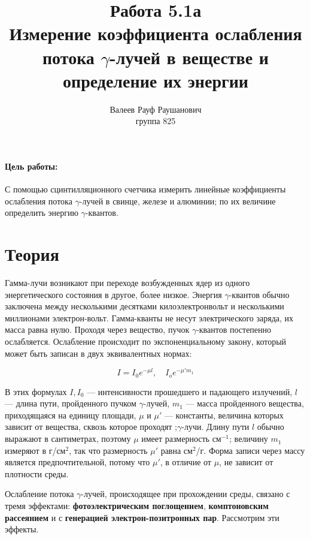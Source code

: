 \documentclass[a4paper, 12pt]{article}%
\author{Валеев Рауф Раушанович \\
группа 825}
\title{\textbf{Работа 5.1а\\
Измерение коэффициента ослабления потока $\gamma$-лучей в веществе и определение их энергии}}
\begin{document}
\maketitle
\newpage
\paragraph*{Цель работы:} С помощью сцинтилляционного счетчика измерить линейные коэффициенты ослабления потока $ \gamma $-лучей в свинце, железе и алюминии; по их величине определить энергию $ \gamma $-квантов.
\section*{Теория}
	Гамма-лучи возникают при переходе возбужденных ядер из одного энергетического состояния в другое, более низкое. Энергия $ \gamma $-квантов обычно заключена между несколькими десятками килоэлектронвольт и несколькими миллионами электрон-вольт. Гамма-кванты не несут электрического заряда, их масса равна нулю. Проходя через вещество, пучок $ \gamma $-квантов постепенно ослабляется. Ослабление происходит по экспоненциальному закону, который может быть записан в двух эквивалентных нормах:
	
	\begin{equation}\label{I(mu)}
	I = I_0 e^{-\mu l}, \quad I_o e^{-\mu 'm_1} 
	\end{equation}
	
	В этих формулах $ I, I_0 $ --- интенсивности прошедшего и падающего излучений, $ l $ --- длина пути, пройденного пучком $\gamma$-лучей, $ m_1 $ --- масса пройденного вещества, приходящаяся на единицу площади, $ \mu $ и $ \mu' $ --- константы, величина которых зависит от вещества, сквозь которое проходят ;$\gamma$-лучи. Длину пути $ l $ обычно выражают в сантиметрах, поэтому $ \mu $ имеет размерность см$ ^{-1} $; величину $ m_1 $ измеряют в г/см$ ^2 $, так что размерность $ \mu' $ равна см$ ^2 $/г. Форма записи через массу является предпочтительной, потому что $ \mu' $, в отличие от $ \mu $, не зависит от плотности среды. 
	
	Ослабление потока $\gamma$-лучей, происходящее при прохождении среды, связано с тремя эффектами: \textbf{фотоэлектрическим поглощением}, \textbf{комптоновским рассеянием} и с \textbf{генерацией электрон-позитронных пар}. Рассмотрим эти эффекты.
\end{document}
